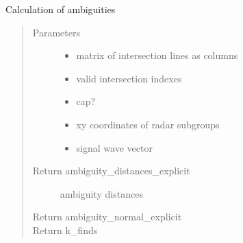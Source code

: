 \documentclass[letterpaper,12pt,english]{sphinxmanual}
\begin{document}
\begin{fulllineitems}
\label{\detokenize{functions:functions.explicit}}
Calculation of ambiguities
\begin{quote}\begin{description}
\item[{Parameters}] \leavevmode\begin{itemize}
\item {} 
 \textendash{} matrix of intersection lines as columns

\item {} 
 \textendash{} valid intersection indexes

\item {} 
 \textendash{} cap?

\item {} 
 \textendash{} xy coordinates of radar subgroups

\item {} 
 \textendash{} signal wave vector

\end{itemize}

\item[{Return ambiguity\_distances\_explicit}] \leavevmode
ambiguity distances

\item[{Return ambiguity\_normal\_explicit}] \leavevmode
\item[{Return k\_finds}] \leavevmode
\end{description}\end{quote}

\end{fulllineitems}

\end{document}
